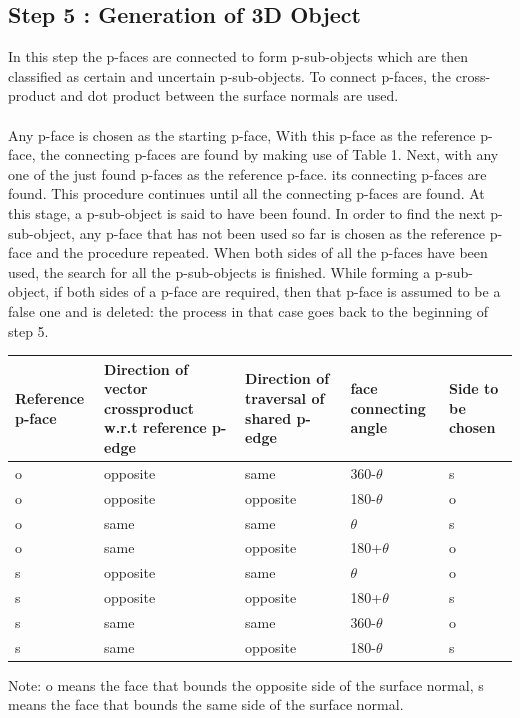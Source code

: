 \documentclass[
11pt, %
english, %
singlespacing, %
headsepline, %
]{MastersDoctoralThesis} %
\begin{document}
\subsection{Step 5 : Generation of 3D Object}
In this step the p-faces are connected to form p-sub-objects which are then classified as certain and uncertain p-sub-objects. To connect p-faces, the cross-product and dot product between the surface normals are used. \\ \\
Any p-face is chosen as the starting p-face, With this p-face as the  reference p-face, the connecting p-faces are found by making use of Table 1. Next, with any one of the just found p-faces as the reference p-face. its connecting p-faces are found. This procedure continues until all the connecting p-faces are found. At
this stage, a p-sub-object is said to have been found. In order to find the next p-sub-object, any p-face that has not been used so far is chosen as the reference p-face and the procedure repeated. When both sides of all the p-faces have been used, the search for all the p-sub-objects is finished. While forming a p-sub-object, if both sides of a p-face are required, then that p-face is assumed to be a false one and is deleted: the process in that case goes back to the beginning of step 5. 
\begin{center}
\begin{tabular}{ |p{2cm}|p{3cm}|p{3cm}|p{2cm}|p{2cm}| } 
\hline
Reference p-face & Direction of vector crossproduct w.r.t reference p-edge & Direction of traversal of shared p-edge & face connecting angle & Side to be chosen \\ \hline \hline
o & opposite & same & 360-$\theta$ & s \\ 
o & opposite & opposite & 180-$\theta$ & o \\ 
o & same & same & $\theta$ & s \\ 
o & same & opposite & 180+$\theta$ & o \\ 
s & opposite & same & $\theta$ & o \\ 
s & opposite & opposite & 180+$\theta$ & s \\ 
s & same & same & 360-$\theta$ & o \\ 
s & same & opposite & 180-$\theta$ & s \\
\hline
\end{tabular}
\end{center}
Note: o means the face that bounds the opposite side of the surface normal, s means the face that bounds the same side of the surface normal. \\ \\
\end{document}
